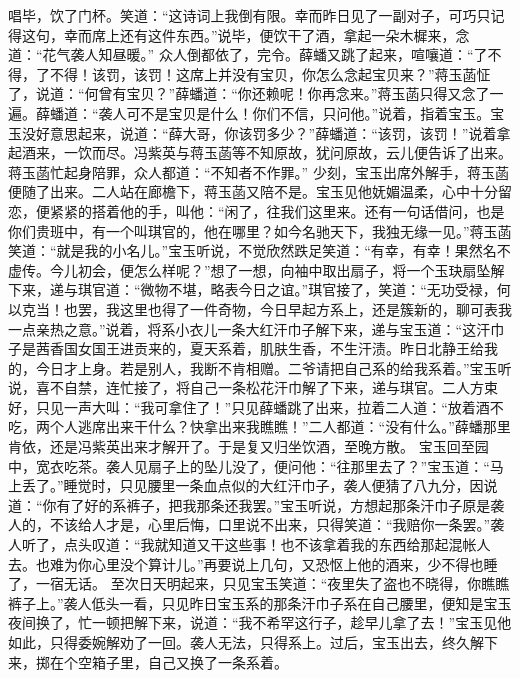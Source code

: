\documentclass[12pt,oneside]{book}
\begin{document}
唱毕，饮了门杯。笑道：“这诗词上我倒有限。幸而昨日见了一副对子，可巧只记得这句，幸而席上还有这件东西。”说毕，便饮干了酒，拿起一朵木樨来，念道：“花气袭人知昼暖。”
众人倒都依了，完令。薛蟠又跳了起来，喧嚷道：“了不得，了不得！该罚，该罚！这席上并没有宝贝，你怎么念起宝贝来？”蒋玉菡怔了，说道：“何曾有宝贝？”薛蟠道：“你还赖呢！你再念来。”蒋玉菡只得又念了一遍。薛蟠道：“袭人可不是宝贝是什么！你们不信，只问他。”说着，指着宝玉。宝玉没好意思起来，说道：“薛大哥，你该罚多少？”薛蟠道：“该罚，该罚！”说着拿起酒来，一饮而尽。冯紫英与蒋玉菡等不知原故，犹问原故，云儿便告诉了出来。蒋玉菡忙起身陪罪，众人都道：“不知者不作罪。”
少刻，宝玉出席外解手，蒋玉菡便随了出来。二人站在廊檐下，蒋玉菡又陪不是。宝玉见他妩媚温柔，心中十分留恋，便紧紧的搭着他的手，叫他：“闲了，往我们这里来。还有一句话借问，也是你们贵班中，有一个叫琪官的，他在哪里？如今名驰天下，我独无缘一见。”蒋玉菡笑道：“就是我的小名儿。”宝玉听说，不觉欣然跌足笑道：“有幸，有幸！果然名不虚传。今儿初会，便怎么样呢？”想了一想，向袖中取出扇子，将一个玉玦扇坠解下来，递与琪官道：“微物不堪，略表今日之谊。”琪官接了，笑道：“无功受禄，何以克当！也罢，我这里也得了一件奇物，今日早起方系上，还是簇新的，聊可表我一点亲热之意。”说着，将系小衣儿一条大红汗巾子解下来，递与宝玉道：“这汗巾子是茜香国女国王进贡来的，夏天系着，肌肤生香，不生汗渍。昨日北静王给我的，今日才上身。若是别人，我断不肯相赠。二爷请把自己系的给我系着。”宝玉听说，喜不自禁，连忙接了，将自己一条松花汗巾解了下来，递与琪官。二人方束好，只见一声大叫：“我可拿住了！”只见薛蟠跳了出来，拉着二人道：“放着酒不吃，两个人逃席出来干什么？快拿出来我瞧瞧！”二人都道：“没有什么。”薛蟠那里肯依，还是冯紫英出来才解开了。于是复又归坐饮酒，至晚方散。
宝玉回至园中，宽衣吃茶。袭人见扇子上的坠儿没了，便问他：“往那里去了？”宝玉道：“马上丢了。”睡觉时，只见腰里一条血点似的大红汗巾子，袭人便猜了八九分，因说道：“你有了好的系裤子，把我那条还我罢。”宝玉听说，方想起那条汗巾子原是袭人的，不该给人才是，心里后悔，口里说不出来，只得笑道：“我赔你一条罢。”袭人听了，点头叹道：“我就知道又干这些事！也不该拿着我的东西给那起混帐人去。也难为你心里没个算计儿。”再要说上几句，又恐怄上他的酒来，少不得也睡了，一宿无话。
至次日天明起来，只见宝玉笑道：“夜里失了盗也不晓得，你瞧瞧裤子上。”袭人低头一看，只见昨日宝玉系的那条汗巾子系在自己腰里，便知是宝玉夜间换了，忙一顿把解下来，说道：“我不希罕这行子，趁早儿拿了去！”宝玉见他如此，只得委婉解劝了一回。袭人无法，只得系上。过后，宝玉出去，终久解下来，掷在个空箱子里，自己又换了一条系着。
\end{document}
